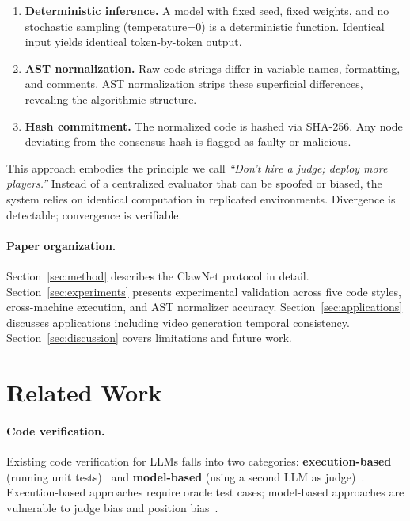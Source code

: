 \documentclass[11pt,a4paper]{article}
\begin{document}
\begin{enumerate}
    \item \textbf{Deterministic inference.} A model with fixed seed,
          fixed weights, and no stochastic sampling (temperature=0) is
          a deterministic function. Identical input yields identical
          token-by-token output.
    \item \textbf{AST normalization.} Raw code strings differ in variable
          names, formatting, and comments. AST normalization strips these
          superficial differences, revealing the algorithmic structure.
    \item \textbf{Hash commitment.} The normalized code is hashed via
          SHA-256. Any node deviating from the consensus hash is flagged
          as faulty or malicious.
\end{enumerate}

This approach embodies the principle we call \emph{``Don't hire a judge;
deploy more players.''} Instead of a centralized evaluator that can be
spoofed or biased, the system relies on identical computation in
replicated environments. Divergence is detectable; convergence is
verifiable.

\paragraph{Paper organization.}
Section~\ref{sec:method} describes the ClawNet protocol in detail.
Section~\ref{sec:experiments} presents experimental validation across
five code styles, cross-machine execution, and AST normalizer accuracy.
Section~\ref{sec:applications} discusses applications including video
generation temporal consistency. Section~\ref{sec:discussion} covers
limitations and future work.

\section{Related Work}
\label{sec:related}

\paragraph{Code verification.}
Existing code verification for LLMs falls into two categories:
\textbf{execution-based} (running unit tests)~\cite{codereval,human-eval}
and \textbf{model-based} (using a second LLM as judge)~\cite{gpt-judge,
self-refine}. Execution-based approaches require oracle test cases;
model-based approaches are vulnerable to judge bias and position
bias~\cite{zheng2023judging}.
\end{document}
